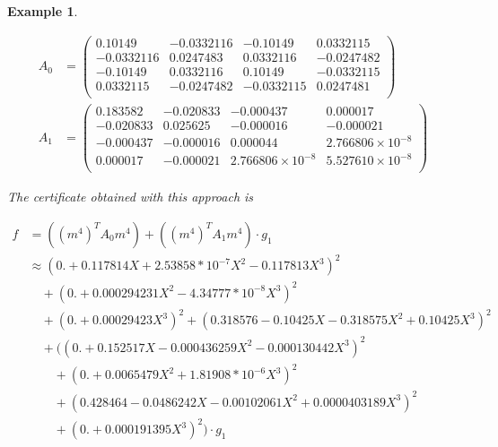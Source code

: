 \documentclass[preprint,12pt,authoryear]{elsarticle}
\newtheorem{example}[theorem]{Example}
\newenvironment{example1}
  {\begin{example}\rm}
  {\end{example}}
\begin{document}
\begin{example1}
\begin{itemize}
    \begin{equation*} 
      \label{sec:comparison-with-an-3}
      \begin{split}
        A_0
        &= \left(
          \begin{array}{cccc}
            0.10149 & -0.0332116 & -0.10149 & 0.0332115 \\
            -0.0332116 & 0.0247483 & 0.0332116 & -0.0247482 \\
            -0.10149 & 0.0332116 & 0.10149 & -0.0332115 \\
            0.0332115 & -0.0247482 & -0.0332115 & 0.0247481 \\
          \end{array}
          \right)\\
        A_1
        &= \left(
          \begin{array}{cccc}
            0.183582 & -0.020833 & -0.000437 & 0.000017
            \\
            -0.020833 & 0.025625 & -0.000016 &
                                               -0.000021 \\
            -0.000437 & -0.000016 & 0.000044 &
                                               2.766806 \times 10^{-8}\\
            0.000017 & -0.000021 &
                                   2.766806 \times 10^{-8}&
                                                            5.527610 \times 10^{-8}\\
          \end{array}
          \right)
      \end{split}
    \end{equation*}

    The certificate obtained with this approach is 

    {
      \small
      \begin{equation*} 
        \begin{split}
          f &= ((m^{4})^{T} A_0 m^{4}) + ((m^{4})^{T} A_1 m^{4}) \cdot g_1\\
            &\approx(0. +0.117814 X+2.53858*10^{-7} X^2-0.117813 X^3)^2\\
            &\quad+(0. +0.000294231
              X^2-4.34777*10^{-8} X^3)^2\\
            &\quad+(0. +0.00029423 X^3)^2+(0.318576 -0.10425 X-0.318575 X^2+0.10425
              X^3)^2\\
            &\quad+ ((0. +0.152517 X-0.000436259 X^2-0.000130442
              X^3)^2\\
            &\quad\quad+(0. +0.0065479 X^2+1.81908*10^{-6} X^3)^2\\
            &\quad\quad+(0.428464 -0.0486242
              X-0.00102061 X^2+0.0000403189 X^3)^2\\
            &\quad\quad+(0. +0.000191395 X^3)^2) \cdot g_1 
        \end{split}
      \end{equation*}
    }


\end{itemize}
\end{example1}
\end{document}
